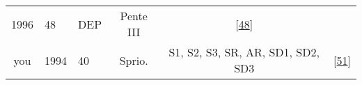 \documentclass[12pt,]{article}
\begin{document}
\begin{landscape}
\begin{longtable}[]{@{}cllccl@{}}
\begin{minipage}[t]{0.05\columnwidth}
1996\strut
\end{minipage} & \begin{minipage}[t]{0.08\columnwidth}\raggedright
48\strut
\end{minipage} & \begin{minipage}[t]{0.14\columnwidth}\centering
DEP\strut
\end{minipage} & \begin{minipage}[t]{0.40\columnwidth}\centering
Pente III\strut
\end{minipage} & \begin{minipage}[t]{0.08\columnwidth}\raggedright
{[}\protect\hyperlink{ref-yaron1996utility}{48}{]}\strut
\end{minipage}\tabularnewline
\begin{minipage}[t]{0.09\columnwidth}\centering
you\strut
\end{minipage} & \begin{minipage}[t]{0.05\columnwidth}\raggedright
1994\strut
\end{minipage} & \begin{minipage}[t]{0.08\columnwidth}\raggedright
40\strut
\end{minipage} & \begin{minipage}[t]{0.14\columnwidth}\centering
Sprio.\strut
\end{minipage} & \begin{minipage}[t]{0.40\columnwidth}\centering
S1, S2, S3, SR, AR, SD1, SD2, SD3\strut
\end{minipage} & \begin{minipage}[t]{0.08\columnwidth}\raggedright
{[}\protect\hyperlink{ref-you1994expiratory}{51}{]}\strut
\end{minipage}\tabularnewline
\bottomrule
\end{longtable}

\end{landscape}
\end{document}
